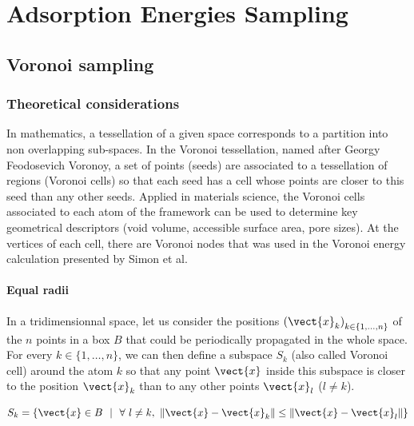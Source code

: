 \documentclass[main]{subfiles}
\begin{document}
\chapter{Adsorption Energies Sampling}
\vspace*{-1\baselineskip}

\section{Voronoi sampling}

\subsection{Theoretical considerations}

In mathematics, a tessellation of a given space corresponds to a partition into non overlapping sub-spaces. In the Voronoi tessellation, named after Georgy Feodosevich Voronoy, a set of points (seeds) are associated to a tessellation of regions (Voronoi cells) so that each seed has a cell whose points are closer to this seed than any other seeds.\cite{Rycroft_2009} Applied in materials science, the Voronoi cells associated to each atom of the framework can be used to determine key geometrical descriptors (void volume, accessible surface area, pore sizes). At the vertices of each cell, there are Voronoi nodes that was used in the Voronoi energy calculation presented by Simon et al.\cite{Simon_2015}

\subsubsection{Equal radii}

In a tridimensionnal space, let us consider the positions ${(\vect{x}_k)}_{k\in\{1,\ldots,n\}}$ of the $n$ points in a box $B$ that could be periodically propagated in the whole space. For every $k\in\{1,\ldots,n\}$, we can then define a subspace $S_{k}$ (also called Voronoi cell) around the atom $k$ so that any point $\vect{x}$ inside this subspace is closer to the position $\vect{x}_k$ than to any other points $\vect{x}_l$ ($l\neq k$). 

\begin{equation}\label{eq:voronoi_partition}
  S_{k} = \left\{\vect{x} \in B\ \ |\ \ \forall\ l\neq k,\ \lVert \vect{x}-\vect{x}_k \rVert \leq \lVert \vect{x}-\vect{x}_l \rVert \right\}
\end{equation}
\end{document}
